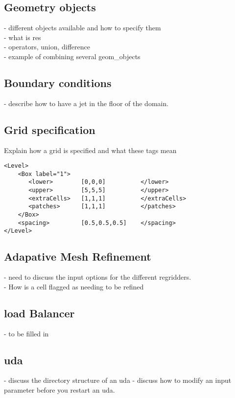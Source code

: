 \subsection{Geometry objects}
- different objects available and how to specify them\\
- what is res \\
- operators, union, difference\\
- example of combining several geom\_objects\\

\subsection{Boundary conditions}
- describe how to have a jet in the floor of the domain.
%
\subsection{Grid specification} \label{Sec:Grid}
Explain how a grid is specified and what these tags mean

\begin{Verbatim}[fontsize=\footnotesize]
<Level>
    <Box label="1">
       <lower>        [0,0,0]          </lower>
       <upper>        [5,5,5]          </upper>
       <extraCells>   [1,1,1]          </extraCells>
       <patches>      [1,1,1]          </patches>
    </Box>
    <spacing>         [0.5,0.5,0.5]    </spacing>
</Level>
 \end{Verbatim}
%
\subsection{Adapative Mesh Refinement}
- need to discuss the input options for the different regridders.\\
- How is a cell flagged as needing to be refined
%
\subsection{load Balancer}
- to be filled in

\subsection{uda}
- discuss the directory structure of an uda
- discuss how to modify an input parameter before you restart an uda.


